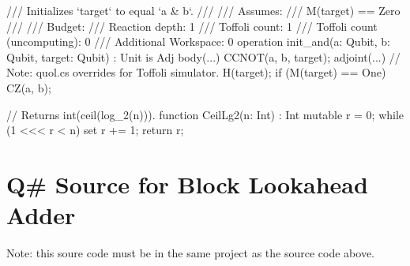 \documentclass[onecolumn,unpublished]{quantumarticle}
\theoremstyle{definition}
\theoremstyle{definition}
\theoremstyle{definition}
\begin{document}
\begin{qsharp}
{    /// Initializes `target` to equal `a & b`.
    ///
    /// Assumes:
    ///     M(target) == Zero
    ///
    /// Budget:
    ///     Reaction depth: 1
    ///     Toffoli count: 1
    ///     Toffoli count (uncomputing): 0
    ///     Additional Workspace: 0
    operation init_and(a: Qubit, b: Qubit, target: Qubit) : Unit is Adj {
        body(...) {
            CCNOT(a, b, target);
        }
        adjoint(...) {
            // Note: quol.cs overrides for Toffoli simulator.
            H(target);
            if (M(target) == One) {
                CZ(a, b);
            }
        }
    }

    // Returns int(ceil(log_2(n))).
    function CeilLg2(n: Int) : Int {
        mutable r = 0;
        while (1 <<< r < n) {
            set r += 1;
        }
        return r;
    }
}
\end{qsharp}

\section{Q\# Source for Block Lookahead Adder}
\label{app:blockadder}

Note: this soure code must be in the same project as the source code above.
\end{document}
